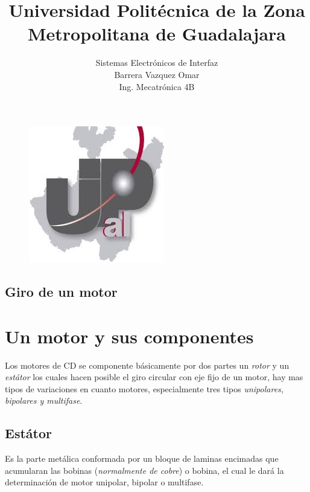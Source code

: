 \documentclass[11pt,a4paper]{article}
\title{Universidad Politécnica de la Zona Metropolitana de Guadalajara}
\begin{document}
\maketitle


\begin{figure}[h]
\begin{center}
\includegraphics[scale=1]{1.jpeg}
\end{center}
\end{figure}

\begin{center}
\section{Giro de un motor}
\end{center}

\begin{center}
\author{Sistemas Electrónicos de Interfaz\\
Barrera Vazquez Omar\\
Ing. Mecatrónica 4B}
\end{center}

\newpage

\section{Un motor y sus componentes}

Los motores de CD se componente básicamente por dos partes un \emph{rotor} y un \emph{estátor} los cuales hacen posible el giro circular  con eje fijo de un motor, hay mas tipos de variaciones en cuanto motores, especialmente tres tipos \emph{unipolares, bipolares y multifase}. 

\subsection{Estátor}

Es la parte metálica conformada por un bloque de laminas encimadas que acumularan las bobinas (\emph{normalmente de cobre}) o bobina, el cual le dará la determinación de motor unipolar, bipolar o multifase.
\end{document}
